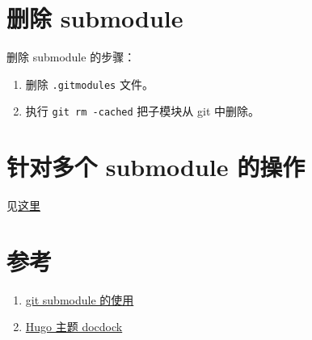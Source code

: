 \documentclass[10pt,a4paper,UTF8]{article}
\begin{document}
\section{删除 submodule}
\label{sec:org8853986}


删除 submodule 的步骤：
\begin{enumerate}
\item 删除 \texttt{.gitmodules} 文件。
\item 执行 \texttt{git rm -cached} 把子模块从 git 中删除。
\end{enumerate}
\section{针对多个 submodule 的操作}
\label{sec:org84d50ae}

见\href{http://blog.csdn.net/wangjia55/article/details/24400501}{这里}

\section{参考}
\label{sec:org41185a7}

\begin{enumerate}
\item \href{http://blog.csdn.net/wangjia55/article/details/24400501}{git submodule 的使用}
\item \href{http://blog.csdn.net/wangjia55/article/details/24400501}{Hugo 主题 docdock}
\end{enumerate}
\end{document}
